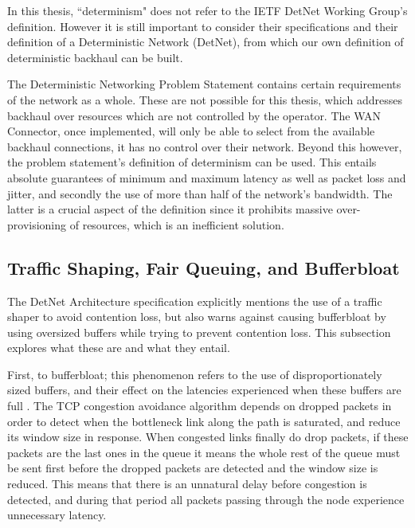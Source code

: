 In this thesis, “determinism" does not refer to the IETF DetNet Working Group's definition. However it is still important to consider their specifications and their definition of a Deterministic Network (DetNet), from which our own definition of deterministic backhaul can be built.

The Deterministic Networking Problem Statement contains certain requirements of the network as a whole. These are not possible for this thesis, which addresses backhaul over resources which are not controlled by the operator. The WAN Connector, once implemented, will only be able to select from the available backhaul connections, it has no control over their network. Beyond this however, the problem statement's definition of determinism can be used. This entails absolute guarantees of minimum and maximum latency as well as packet loss and jitter, and secondly the use of more than half of the network's bandwidth. The latter is a crucial aspect of the definition since it prohibits massive over-provisioning of resources, which is an inefficient solution.

\subsection{Traffic Shaping, Fair Queuing, and Bufferbloat}

The DetNet Architecture specification \cite{detnet-arch} explicitly mentions the use of a traffic shaper to avoid contention loss, but also warns against causing bufferbloat by using oversized buffers while trying to prevent contention loss. This subsection explores what these are and what they entail.

First, to bufferbloat; this phenomenon refers to the use of disproportionately sized buffers, and their effect on the latencies experienced when these buffers are full \cite{allman2012comments, gettys2011bufferbloat}. The TCP congestion avoidance algorithm depends on dropped packets in order to detect when the bottleneck link along the path is saturated, and reduce its window size in response. When congested links finally do drop packets, if these packets are the last ones in the queue it means the whole rest of the queue must be sent first before the dropped packets are detected and the window size is reduced. This means that there is an unnatural delay before congestion is detected, and during that period all packets passing through the node experience unnecessary latency. %

